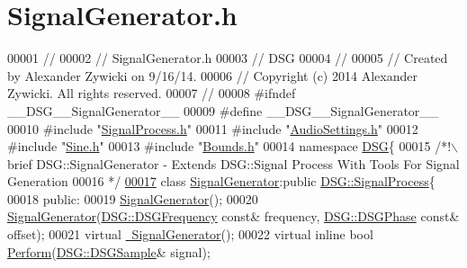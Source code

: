 \hypertarget{_signal_generator_8h_source}{\section{Signal\+Generator.\+h}
\label{_signal_generator_8h_source}
}

\begin{DoxyCode}
00001 \textcolor{comment}{//}
00002 \textcolor{comment}{//  SignalGenerator.h}
00003 \textcolor{comment}{//  DSG}
00004 \textcolor{comment}{//}
00005 \textcolor{comment}{//  Created by Alexander Zywicki on 9/16/14.}
00006 \textcolor{comment}{//  Copyright (c) 2014 Alexander Zywicki. All rights reserved.}
00007 \textcolor{comment}{//}
00008 \textcolor{preprocessor}{#ifndef \_\_DSG\_\_SignalGenerator\_\_}
00009 \textcolor{preprocessor}{#define \_\_DSG\_\_SignalGenerator\_\_}
00010 \textcolor{preprocessor}{#include "\hyperlink{_signal_process_8h}{SignalProcess.h}"}
00011 \textcolor{preprocessor}{#include "\hyperlink{_audio_settings_8h}{AudioSettings.h}"}
00012 \textcolor{preprocessor}{#include "\hyperlink{_sine_8h}{Sine.h}"}
00013 \textcolor{preprocessor}{#include "\hyperlink{_bounds_8h}{Bounds.h}"}
00014 \textcolor{keyword}{namespace }\hyperlink{namespace_d_s_g}{DSG}\{\textcolor{comment}{}
00015 \textcolor{comment}{    /*!\(\backslash\)brief DSG::SignalGenerator - Extends DSG::Signal Process With Tools For Signal Generation}
00016 \textcolor{comment}{     */}
\hypertarget{_signal_generator_8h_source_l00017}{}\hyperlink{class_d_s_g_1_1_signal_generator}{00017}     \textcolor{keyword}{class }\hyperlink{class_d_s_g_1_1_signal_generator}{SignalGenerator}:\textcolor{keyword}{public} \hyperlink{class_d_s_g_1_1_signal_process}{DSG::SignalProcess}\{
00018     \textcolor{keyword}{public}:
00019         \hyperlink{class_d_s_g_1_1_signal_generator_a13ebda67fcdc880ef41aff501cc23fc3}{SignalGenerator}();
00020         \hyperlink{class_d_s_g_1_1_signal_generator_a13ebda67fcdc880ef41aff501cc23fc3}{SignalGenerator}(\hyperlink{namespace_d_s_g_a4315a061386fa1014fda09b15d3a6973}{DSG::DSGFrequency} \textcolor{keyword}{const}& frequency,
      \hyperlink{namespace_d_s_g_a44431ce1eb0a7300efdd207bc879e52c}{DSG::DSGPhase} \textcolor{keyword}{const}& offset);
00021         \textcolor{keyword}{virtual} \hyperlink{class_d_s_g_1_1_signal_generator_a7b52d391974bc36a19fdcf617ad976cb}{~SignalGenerator}();
00022         \textcolor{keyword}{virtual} \textcolor{keyword}{inline} \textcolor{keywordtype}{bool} \hyperlink{class_d_s_g_1_1_signal_generator_a46fe75a81a242e191c5049d33ddf4155}{Perform}(\hyperlink{namespace_d_s_g_ac39a94cd27ebcd9c1e7502d0c624894a}{DSG::DSGSample}& signal);

\end{DoxyCode}
